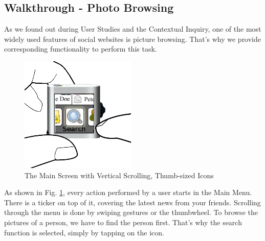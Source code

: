 %
%
% 

\subsection{Walkthrough - Photo Browsing}

As we found out during User Studies and the Contextual Inquiry, one of the most widely used features of social websites is picture browsing.
That's why we provide corresponding functionality to perform this task.
%
\begin{figure}[h]
  \begin{center}
    \includegraphics[width=0.6\linewidth]{imgs/wt1.png}
  \end{center}
  \caption{The Main Screen with Vertical Scrolling, Thumb-sized Icons}
  \label{fig:wt1}
\end{figure}
%
As shown in Fig. \ref{fig:wt1}, every action performed by a user starts in the Main Menu. There is a ticker on top of it, covering the latest news from your friends. Scrolling through the menu is done by swiping gestures or the thumbwheel.
To browse the pictures of a person, we have to find the person first. That's why the search function is selected, simply by tapping on the icon.
\\
\\
